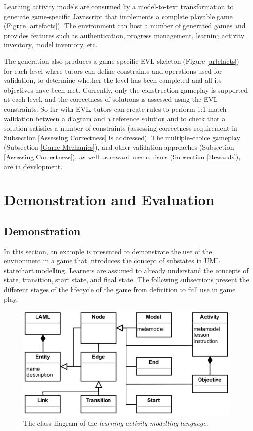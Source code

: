 \documentclass[10pt, a4paper]{report} \usepackage[titletoc]{appendix}
\begin{document}
Learning activity models are consumed by a model-to-text transformation to generate game-specific Javascript that implements a complete playable game (Figure \ref{artefacts}). The environment can host a number of generated games and provides features such as authentication, progress management, learning activity inventory, model inventory, etc. 

The generation also produces a game-specific EVL skeleton (Figure \ref{artefacts}) for each level where tutors can define constraints and operations used for validation, to determine whether the level has been completed and all its objectives have been met. Currently, only the construction gameplay is supported at each level, and the correctness of solutions is assessed using the EVL constraints. So far with EVL, tutors can create rules to perform 1:1 match validation between a diagram and a reference solution and to check that a solution satisfies a number of constraints (assessing correctness requirement in Subsection \ref{Assessing Correctness} is addressed). The multiple-choice gameplay (Subsection \ref{Game Mechanics}), and other validation approaches (Subsection \ref{Assessing Correctness}), as well as reward mechanisms (Subsection \ref{Rewards}), are in development. 


\section{Demonstration and Evaluation}

\subsection{Demonstration}
In this section, an example is presented to demonstrate the use of the environment in a game that introduces the concept of substates in UML statechart modelling. Learners are assumed to already understand the concepts of state, transition, start state, and final state. The following subsections present the different stages of the lifecycle of the game from definition to full use in game play.

\begin{figure}[t!]
\centering
\includegraphics[width=12cm]{laml}
\caption{The class diagram of the \emph{learning activity modelling language}.}
\label{laml}
\end{figure}
\end{document}
